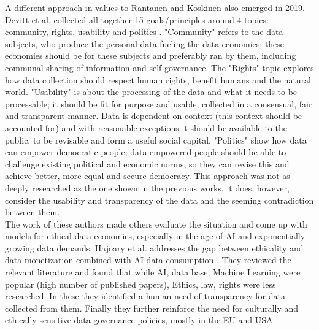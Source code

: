 \documentclass[a4paper,11pt]{report} %
\theoremstyle{change}
\theoremstyle{theoremstyle}
\begin{document}
A different approach in values to Rantanen and Koskinen also emerged in 2019. Devitt et al. collected all together 15 goals/principles around 4 topics: community, rights, usability and politics \cite{devitt2019principles}. "Community" refers to the data subjects, who produce the personal data fueling the data economies; these economies should be for these subjects and preferably ran by them, including communal sharing of information and self-governance. The "Rights" topic explores how data collection should respect human rights, benefit humans and the natural world. "Usability" is about the processing of the data and what it needs to be processable; it should be fit for purpose and usable, collected in a consensual, fair and transparent manner. Data is dependent on context (this context should be accounted for) and with reasonable exceptions it should be available to the public, to be revisable and form a useful social capital. "Politics" show how data can empower democratic people; data empowered people should be able to challenge existing political and economic norms, so they can revise this and achieve better, more equal and secure democracy. This approach was not as deeply researched as the one shown in the previous works, it does, however, consider the usability and transparency of the data and the seeming contradiction between them.\\

The work of these authors made others evaluate the situation and come up with models for ethical data economies, especially in the age of AI and exponentially growing data demands. 
Hajoary et al. addresses the gap between ethicality and data monetization combined with AI data consumption \cite{hajoary2023exploring}. They reviewed the relevant literature and found that while AI, data base, Machine Learning were popular (high number of published papers), Ethics, law, rights were less researched. In these they identified a human need of transparency for data collected from them. Finally they further reinforce the need for culturally and ethically sensitive data governance policies, mostly in the EU and USA.\\
\end{document}
